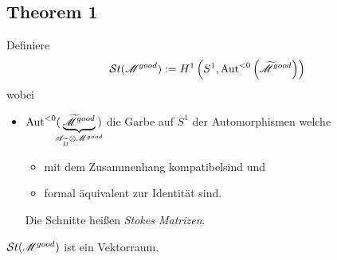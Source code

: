 \begin{comment}
Definiere
\[
  \Syst(A^0):=\left\{A \mid A=\hat F[A^0]\text{ für ein }\hat F\in\hat G
    :=\GL_n(\C\llbracket t\rrbracket)\right\}
\]
\begin{center}
  \textbf{Wir sind interessiert in $\Syst(A^0)/G\{t\}$.}
\end{center}
wobei $G\{t\}:=\GL_n(\C\{t\})$ \emph{lokale analytischen Gauge
Tranformationen}
\begin{itemize}
  \item mit Wirkung $F[A^0]=(dF)F^{-1}+FA^0F^{-1}$.
    \marginnote{\tiny see \cite{sabbah2007isomonodromic} II.2.a}
\end{itemize}
Wir benötigen aber den etwas größeren Raum
\[
  \widehat\Syst(A^0):=
    \left\{(A,\hat F)\in\Syst(A^0)\times\hat G\mid A=\hat F[A^0]\right\}
\]
und damit
\begin{paracol}{5}
  $\cH(A^0):=\widehat\Syst(A^0)/G\{t\}$
\switchcolumn
\switchcolumn
  $\sH(\sM^{good}):=\left\{(\sM,\nabla,\hat f)
      \mid \hat f:(\sM,\nabla)\overset{\cong}\to(\sM^{good},\nabla^{good})
    \right\}/\sim$
\end{paracol}
\TODO[ist $\cH(A^0)$ der Halm bei $0$ von $\sH(\sM^{good})$?]
\end{comment}

\subsection{Theorem 1} %
\begin{defn}
  Definiere %
  \[
    \mathcal{S}{}t(\mathscr{M}^{good})
      :=H^1\left(S^1,\operatorname{Aut}^{<0}\left(\widetilde {\mathscr{M}}^{good}\right)\right)
  \]
  wobei
  \begin{itemize}
    \item $\operatorname{Aut}^{<0}(\!\!\!\underset{\mathscr{A}_{\widetilde D}\otimes\mathscr{M}^{good}}
      {\underbrace{\widetilde{\mathscr{M}}^{good}}}\!\!\!)$
      die Garbe auf $S^1$ der Automorphismen welche
      \begin{itemize}
        \item mit dem Zusammenhang kompatibel\TODO[in Formeln] sind und
        \item formal äquivalent zur Identität sind.
      \end{itemize}
      Die Schnitte heißen \emph{Stokes Matrizen}.
  \end{itemize}
  \begin{thm}
    $\mathcal{S}{}t(\mathscr{M}^{good})$ ist ein Vektorraum.
  \end{thm}
\end{defn}

